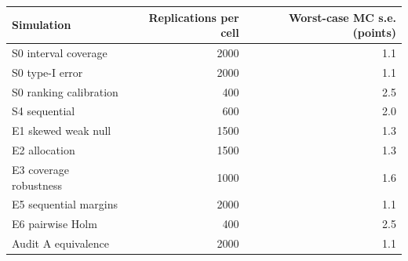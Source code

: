 \begin{tabular}{lrr}
\toprule
Simulation & Replications per cell & Worst-case MC s.e. (points) \\
\midrule
S0 interval coverage & 2000 & 1.1 \\
S0 type-I error & 2000 & 1.1 \\
S0 ranking calibration & 400 & 2.5 \\
S4 sequential & 600 & 2.0 \\
E1 skewed weak null & 1500 & 1.3 \\
E2 allocation & 1500 & 1.3 \\
E3 coverage robustness & 1000 & 1.6 \\
E5 sequential margins & 2000 & 1.1 \\
E6 pairwise Holm & 400 & 2.5 \\
Audit A equivalence & 2000 & 1.1 \\
\bottomrule
\end{tabular}

